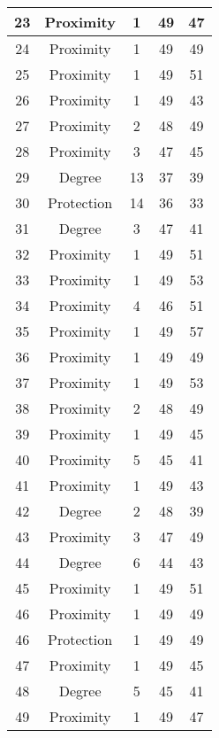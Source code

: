 \documentclass[results.tex]{subfiles}
\begin{document}
\begin{center}
\begin{tabular}{| c || c | c | c | c |}
    \hline
    23 & Proximity & 1 & 49 & 47 \\ 
    \hline
    24 & Proximity & 1 & 49 & 49 \\ 
    \hline
    25 & Proximity & 1 & 49 & 51 \\ 
    \hline
    26 & Proximity & 1 & 49 & 43 \\ 
    \hline
    27 & Proximity & 2 & 48 & 49 \\ 
    \hline
    28 & Proximity & 3 & 47 & 45 \\ 
    \hline
    29 & Degree & 13 & 37 & 39 \\ 
    \hline
    30 & Protection & 14 & 36 & 33 \\ 
    \hline
    31 & Degree & 3 & 47 & 41 \\ 
    \hline
    32 & Proximity & 1 & 49 & 51 \\ 
    \hline
    33 & Proximity & 1 & 49 & 53 \\ 
    \hline
    34 & Proximity & 4 & 46 & 51 \\ 
    \hline
    35 & Proximity & 1 & 49 & 57 \\ 
    \hline
    36 & Proximity & 1 & 49 & 49 \\ 
    \hline
    37 & Proximity & 1 & 49 & 53 \\ 
    \hline
    38 & Proximity & 2 & 48 & 49 \\ 
    \hline
    39 & Proximity & 1 & 49 & 45 \\ 
    \hline
    40 & Proximity & 5 & 45 & 41 \\ 
    \hline
    41 & Proximity & 1 & 49 & 43 \\ 
    \hline
    42 & Degree & 2 & 48 & 39 \\ 
    \hline
    43 & Proximity & 3 & 47 & 49 \\ 
    \hline
    44 & Degree & 6 & 44 & 43 \\ 
    \hline
    45 & Proximity & 1 & 49 & 51 \\ 
    \hline
    46 & Proximity & 1 & 49 & 49 \\ 
    \hline
    46 & Protection & 1 & 49 & 49 \\ 
    \hline
    47 & Proximity & 1 & 49 & 45 \\ 
    \hline
    48 & Degree & 5 & 45 & 41 \\ 
    \hline
    49 & Proximity & 1 & 49 & 47 \\ 
    \hline   \end{tabular}
\end{center}
\end{document}
